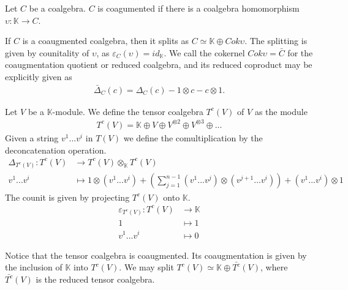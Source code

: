 \documentclass[../thesis.tex]{subfiles}
\begin{document}
            \begin{definition}
                Let $C$ be a coalgebra. $C$ is coagumented if there is a coalgebra homomorphism $\upsilon:\mathbb{K}\rightarrow C$.
            \end{definition}

            If $C$ is a coaugmented coalgebra, then it splits as $C\simeq \mathbb{K}\oplus Cok\upsilon$. The splitting is given by counitality of $\upsilon$, as $\varepsilon_C(\upsilon) = id_{\mathbb{K}}$. We call the cokernel $Cok\upsilon = \bar{C}$ for the coaugmentation quotient or reduced coalgebra, and its reduced coproduct may be explicitly given as
            \begin{align*}
                \bar{\Delta}_C(c) = \Delta_C(c) - 1\otimes c - c\otimes 1. 
            \end{align*}

            \begin{definition}
                Let $V$ be a $\mathbb{K}$-module. We define the tensor coalgebra $T^c(V)$ of $V$ as the module
                \begin{align*}
                    T^c(V) = \mathbb{K}\oplus V\oplus V^{\otimes 2}\oplus V^{\otimes 3}\oplus ...
                \end{align*}
                Given a string $v^1...v^i$ in $T(V)$ we define the comultiplication by the deconcatenation operation.
                \begin{align*}
                    \Delta_{T^c(V)}:T^c(V) & \rightarrow T^c(V)\otimes_{\mathbb{K}}T^c(V) \\
                    v^1...v^i & \mapsto 1\otimes(v^1...v^i) + (\sum_{j=1}^{n-1} (v^1...v^{j})\otimes(v^{j+1}...v^i)) + (v^1...v^i)\otimes 1
                \end{align*}
                The counit is given by projecting $T^c(V)$ onto $\mathbb{K}$.
                \begin{align*}
                    \varepsilon_{T^c(V)} : T^c(V) & \rightarrow \mathbb{K} \\
                    1 & \mapsto 1 \\
                    v^1...v^i & \mapsto 0
                \end{align*}
            \end{definition}

            Notice that the tensor coalgebra is coaugmented. Its coaugmentation is given by the inclusion of $\mathbb{K}$ into $T^c(V)$. We may split $T^c(V) \simeq \mathbb{K}\oplus \bar{T^c}(V)$, where $\bar{T^c}(V)$ is the reduced tensor coalgebra.
\end{document}

